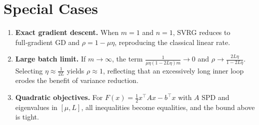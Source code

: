 \documentclass{article}
\begin{document}
\section*{Special Cases}
\begin{enumerate}
\item \textbf{Exact gradient descent.} When $m=1$ and $n=1$, SVRG reduces to full‑gradient GD and $\rho=1-\mu\eta$, reproducing the classical linear rate.
\item \textbf{Large batch limit.} If $m\to\infty$, the term $\frac{1}{\mu\eta(1-2L\eta)m}\to0$ and $\rho\to\frac{2L\eta}{1-2L\eta}$. Selecting $\eta\approx\frac{1}{2L}$ yields $\rho\approx1$, reflecting that an excessively long inner loop erodes the benefit of variance reduction.
\item \textbf{Quadratic objectives.} For $F(x)=\frac12x^{\top}Ax-b^{\top}x$ with $A$ SPD and eigenvalues in $[\mu,L]$, all inequalities become equalities, and the bound above is tight.
\end{enumerate}
\end{document}
